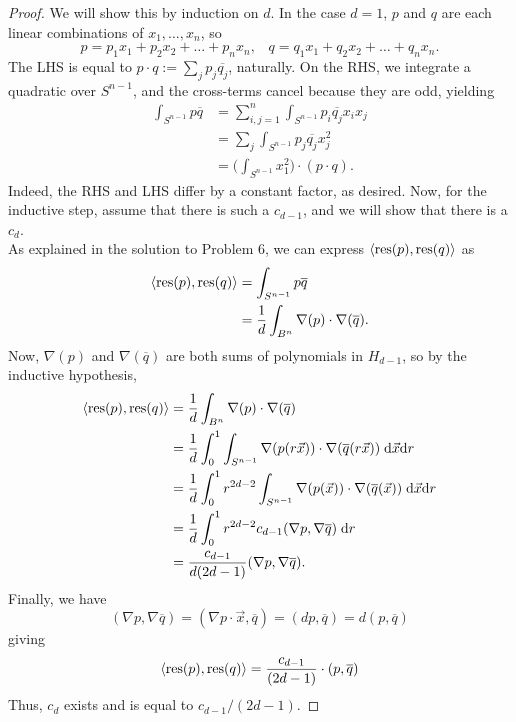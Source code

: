 \documentclass{amsart}
\DeclareMathOperator{\res}{res}
\begin{document}
 \begin{proof}
 	We will show this by induction on $d$. In the case $d=1$, $p$ and $q$ are each linear combinations of $x_1,\dots,x_n$, so 
 	$$
 	p = p_1x_1 + p_2x_2+\dots +p_n x_n, \;\;\; 	q = q_1x_1 + q_2x_2+\dots +q_n x_n.
 	$$
 	The LHS is equal to $p\cdot q:= \sum_j p_j\overline{q_j}$, naturally. On the RHS, we integrate a quadratic over $S^{n-1}$, and the cross-terms cancel because they are odd, yielding
 	\begin{align*}
 		\int_{S^{n-1}} p\overline{q} &= \sum_{i,j=1}^n \int_{S^{n-1}} p_i\overline{q_j} x_ix_j\\
 		&= \sum_j \int_{S^{n-1}} p_j\overline{q_j} x_j^2\\
 		&= \bigg(\int_{S^{n-1}} x_1^2 \bigg) \cdot (p \cdot q).
 	\end{align*}
 	Indeed, the RHS and LHS differ by a constant factor, as desired. Now, for the inductive step, assume that there is such a $c_{d-1}$, and we will show that there is a $c_d$.\\
 	
 	As explained in the solution to Problem 6, we can express $\<\res(p),\res(q)\>$ as 
 	\begin{align*}
 		\<\res(p),\res(q)\> &= \int_{S^{n-1}} p\overline{q} \\
 		&= \frac{1}{d}\int_{B^n} \nabla(p) \cdot \nabla(\overline{q}).
 	\end{align*}
 	Now, $\nabla(p)$ and $\nabla(\overline{q})$ are both sums of polynomials in $H_{d-1}$, so by the inductive hypothesis,
 	\begin{align*}
 		\<\res(p),\res(q)\> &= \frac{1}{d}\int_{B^n} \nabla(p) \cdot \nabla(\overline{q})\\
 		&= \frac{1}{d} \int_{0}^1 \int_{S^{n-1}} \nabla(p(r\vec{x})) \cdot \nabla(\overline{q}(r\vec{x})) \;\d \vec{x} \d r\\
 		&= \frac{1}{d} \int_{0}^1 r^{2d-2} \int_{S^{n-1}} \nabla(p(\vec{x})) \cdot \nabla(\overline{q}(\vec{x})) \;\d \vec{x} \d r\\
 		&= \frac{1}{d} \int_{0}^1 r^{2d-2} c_{d-1} (\nabla p,\nabla\overline{q})\;\d r\\
 		&= \frac{c_{d-1}}{d(2d-1)} (\nabla p, \nabla \overline{q}).
 	\end{align*}
 	Finally, we have
 	$$
 	(\nabla p,\nabla \overline{q}) = (\nabla p \cdot \vec{x},\overline{q}) = (dp,\overline{q}) = d(p,\overline{q})
 	$$
 	giving 
 	$$
 	\<\res(p),\res(q)\> = \frac{c_{d-1}}{(2d-1)} \cdot (p,\overline{q})
 	$$
 	Thus, $c_d$ exists and is equal to $c_{d-1}/(2d-1)$.
 \end{proof}
 
\end{document}
